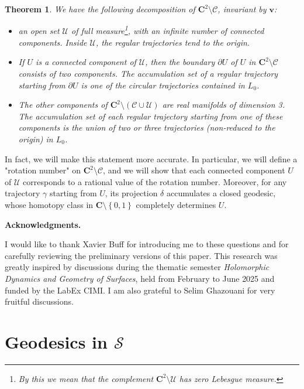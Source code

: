 \documentclass[11pt]{article}
\newtheorem{thm}{Theorem}[section]
\begin{document}
\begin{thm}
\label{thm:main}
    We have the following decomposition of $\mathbf{C}^{2}\setminus\mathcal{C}$, invariant by $\mathbf{v}$:
    \begin{itemize}
        \item an open set $\mathcal{U}$ of full measure\footnote{By this we mean that the complement $\mathbf{C}^{2}\setminus\mathcal{U}$ has zero Lebesgue measure.}, with an infinite number of connected components. Inside $\mathcal{U}$, the regular trajectories tend to the origin.
        \item If $U$ is a connected component of $\mathcal{U}$, then the boundary $\partial U$ of $U$ in $\mathbf{C}^{2}\setminus\mathcal{C}$ consists of two components. The accumulation set of a regular trajectory starting from $\partial U$ is one of the circular trajectories contained in $L_{0}$.
        \item The other components of $\mathbf{C}^{2}\setminus(\mathcal{C}\cup\mathcal{U})$ are real manifolds of dimension 3. The accumulation set of each regular trajectory starting from one of these components is the union of two or three trajectories (non-reduced to the origin) in $L_{0}$.
    \end{itemize}
\end{thm}

In fact, we will make this statement more accurate. In particular, we will define a "rotation number" on $\mathbf{C}^{2}\setminus\mathcal{C}$, and we will show that each connected component $U$ of $\mathcal{U}$ corresponds to a rational value of the rotation number. Moreover, for any trajectory $\gamma$ starting from $U$, its projection $\delta$ accumulates a closed geodesic, whose homotopy class in $\mathbf{C}\setminus\left\{0,1\right\}$ completely determines $U$.

\vspace{1\baselineskip}

\textbf{Acknowledgments.} 

I would like to thank Xavier Buff for introducing me to these questions and for carefully reviewing the preliminary versions of this paper. This research was greatly inspired by discussions during the thematic semester \textit{Holomorphic Dynamics and Geometry of Surfaces}, held from February to June 2025 and funded by the LabEx CIMI. I am also grateful to Selim Ghazouani for very fruitful discussions.

\section{Geodesics in $\mathcal{S}$}
\end{document}
